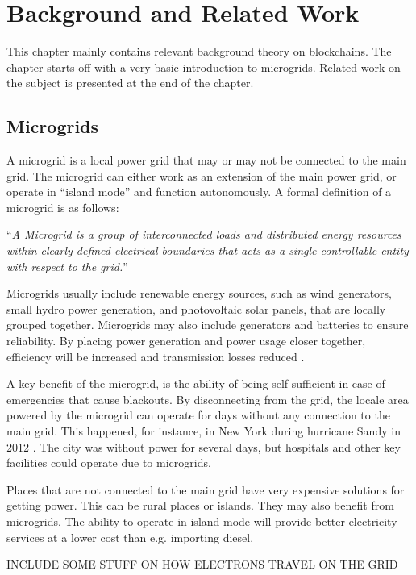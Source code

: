 \chapter{Background and Related Work}
This chapter mainly contains relevant background theory on blockchains. The chapter starts off with a very basic introduction to microgrids. Related work on the subject is presented at the end of the chapter. 

\section{Microgrids}
A microgrid is a local power grid that may or may not be connected to the main grid. The microgrid can either work as an extension of the main power grid, or operate in \enquote{island mode} and function autonomously. A formal definition of a microgrid is as follows: 

\enquote{\textit{A Microgrid is a group of interconnected loads and distributed energy resources within clearly defined electrical boundaries that acts as a single controllable entity with respect to the grid.}} \cite{micro_securicon}

Microgrids usually include renewable energy sources, such as wind generators, small hydro power generation, and photovoltaic solar panels, that are locally grouped together. Microgrids may also include generators and batteries to ensure reliability. \cite{general_microgrid} By placing power generation and power usage closer together, efficiency will be increased and transmission losses reduced \cite{Microgrid_konashevych}. 

A key benefit of the microgrid, is the ability of being self-sufficient in case of emergencies that cause blackouts. By disconnecting from the grid, the locale area powered by the microgrid can operate for days without any connection to the main grid. This happened, for instance, in New York during hurricane Sandy in 2012 \cite{sandy}. The city was without power for several days, but hospitals and other key facilities could operate due to microgrids. 

Places that are not connected to the main grid have very expensive solutions for getting power. This can be rural places or islands. They may also benefit from microgrids. The ability to operate in island-mode will provide better electricity services at a lower cost than e.g. importing diesel. \cite{abb}

INCLUDE SOME STUFF ON HOW ELECTRONS TRAVEL ON THE GRID 

